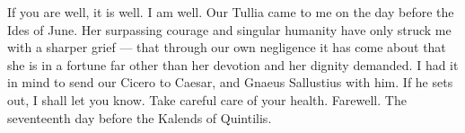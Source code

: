 

If you are well, it is well. I am well. Our Tullia came to me on the day before the Ides of June. Her surpassing courage and singular humanity have only struck me with a sharper grief --- that through our own negligence it has come about that she is in a fortune far other than her devotion and her dignity demanded. I had it in mind to send our Cicero to Caesar, and Gnaeus Sallustius with him. If he sets out, I shall let you know. Take careful care of your health. Farewell. The seventeenth day before the Kalends of Quintilis.

